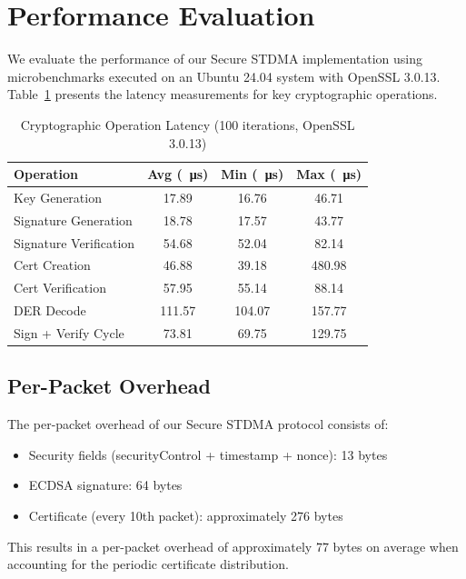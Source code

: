 \documentclass[conference]{IEEEtran}
\begin{document}
\section{Performance Evaluation}
\label{sec:evaluation}

We evaluate the performance of our Secure STDMA implementation using microbenchmarks executed on an Ubuntu 24.04 system with OpenSSL 3.0.13. Table~\ref{tab:benchmarks} presents the latency measurements for key cryptographic operations.

\begin{table}[htbp]
\caption{Cryptographic Operation Latency (100 iterations, OpenSSL 3.0.13)}
\begin{center}
\begin{tabular}{lccc}
\toprule
Operation & Avg (\SI{}{\micro\second}) & Min (\SI{}{\micro\second}) & Max (\SI{}{\micro\second}) \\
\midrule
Key Generation & 17.89 & 16.76 & 46.71 \\
Signature Generation & 18.78 & 17.57 & 43.77 \\
Signature Verification & 54.68 & 52.04 & 82.14 \\
Cert Creation & 46.88 & 39.18 & 480.98 \\
Cert Verification & 57.95 & 55.14 & 88.14 \\
DER Decode & 111.57 & 104.07 & 157.77 \\
Sign + Verify Cycle & 73.81 & 69.75 & 129.75 \\
\bottomrule
\end{tabular}
\end{center}
\label{tab:benchmarks}
\end{table}

\subsection{Per-Packet Overhead}

The per-packet overhead of our Secure STDMA protocol consists of:
\begin{itemize}
    \item Security fields (securityControl + timestamp + nonce): 13 bytes
    \item ECDSA signature: 64 bytes
    \item Certificate (every 10th packet): approximately 276 bytes
\end{itemize}

This results in a per-packet overhead of approximately 77 bytes on average when accounting for the periodic certificate distribution.
\end{document}
